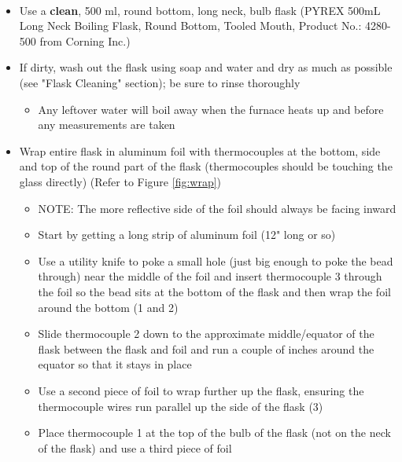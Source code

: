 \documentclass[letterpaper,11pt]{article}
\begin{document}
\begin{itemize}
\begin{itemize}
        \item Use a \textbf{clean}, 500 ml, round bottom, long neck, bulb flask 
            (PYREX\textsuperscript{\textcopyright} 500mL Long Neck Boiling 
            Flask, Round Bottom, Tooled Mouth, Product No.: 4280-500 from 
            Corning Inc.)
        \item If dirty, wash out the flask using soap and water and dry as much 
            as possible (see "Flask Cleaning" section); be sure to rinse
            thoroughly
                \begin{itemize}
                \item Any leftover water will boil away when the furnace heats 
                up and before any measurements are taken
                \end{itemize}        
        \item Wrap entire flask in aluminum foil with thermocouples at the 
            bottom, side and top of the round part of the flask (thermocouples 
            should be touching the glass directly) (Refer to Figure 
            \ref{fig:wrap})
                \begin{itemize}
                \item NOTE: The more reflective side of the foil should always 
                    be facing inward
                \item Start by getting a long strip of aluminum foil (12" long 
                    or so)
                \item Use a utility knife to poke a small hole (just big enough 
                    to poke the bead through) near the middle of 
                    the foil and insert thermocouple 3 through the foil so the 
                    bead sits at the bottom of the flask and then wrap the foil 
                    around the bottom (1 and 2)
                \item Slide thermocouple 2 down to the approximate 
                    middle/equator of the flask between the flask and foil and run
                    a couple of inches around the equator so that it stays in place  
                \item Use a second piece of foil to wrap further up the flask, 
                    ensuring the thermocouple wires run parallel up the side of 
                    the flask (3)
                \item Place thermocouple 1 at the top of the bulb of the flask 
                    (not on the neck of the flask) and use a third piece of foil

\end{itemize}
\end{itemize}
\end{itemize}
\end{document}
